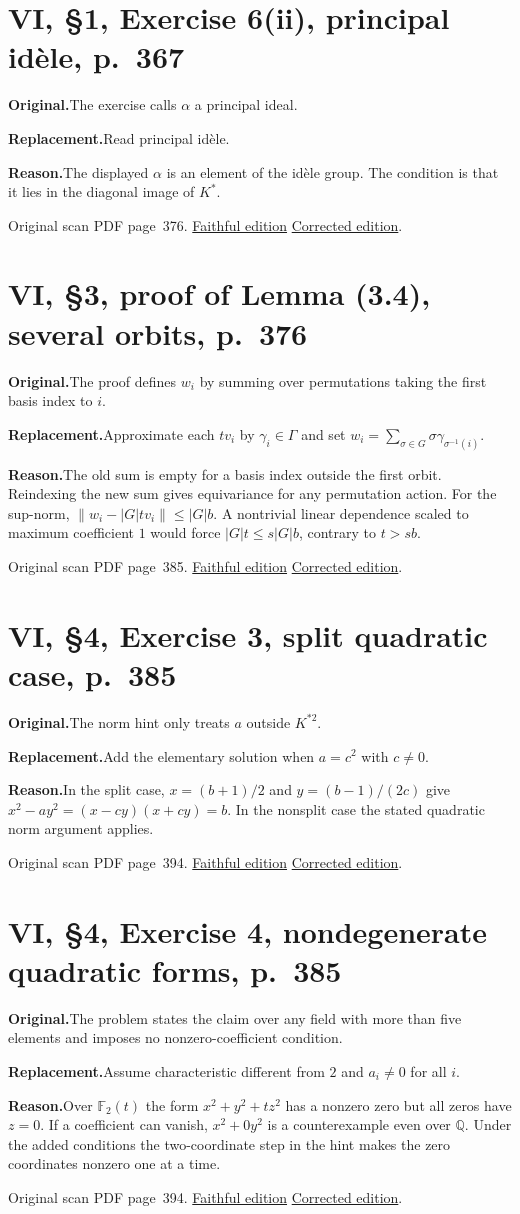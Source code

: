 \documentclass[11pt,a4paper]{article}
\newcommand{\original}{\par\smallskip\noindent\textbf{Original.}\enspace}
\newcommand{\replacement}{\par\smallskip\noindent\textbf{Replacement.}\enspace}
\newcommand{\reason}{\par\smallskip\noindent\textbf{Reason.}\enspace}
\newcommand{\editionlink}[3]{\href{#1\#errata.#2}{#3}}
\newcommand{\location}[2]{%
  \par\smallskip\noindent Original scan PDF page~#2.\enspace
  \editionlink{Neukirch_Faithful.pdf}{#1}{Faithful edition}
  \quad\editionlink{Neukirch_Corrected.pdf}{#1}{Corrected edition}.}
\begin{document}
\setcounter{section}{132}
\section{VI, \S1, Exercise 6(ii), principal idèle, p.~367}\label{errata:item:133}

\original The exercise calls $\alpha$ a principal ideal.
\replacement Read principal idèle.
\reason The displayed $\alpha$ is an element of the idèle group. The condition is that it lies in the diagonal image of $K^*$.
\location{133}{376}

\setcounter{section}{133}
\section{VI, \S3, proof of Lemma (3.4), several orbits, p.~376}\label{errata:item:134}

\original The proof defines $w_i$ by summing over permutations taking the first basis index to $i$.
\replacement Approximate each $tv_i$ by $\gamma_i\in\Gamma$ and set $w_i=\sum_{\sigma\in G}\sigma\gamma_{\sigma^{-1}(i)}$.
\reason The old sum is empty for a basis index outside the first orbit. Reindexing the new sum gives equivariance for any permutation action. For the sup-norm, $\|w_i-|G|tv_i\|\le |G|b$. A nontrivial linear dependence scaled to maximum coefficient $1$ would force $|G|t\le s|G|b$, contrary to $t>sb$.
\location{134}{385}

\setcounter{section}{134}
\section{VI, \S4, Exercise 3, split quadratic case, p.~385}\label{errata:item:135}

\original The norm hint only treats $a$ outside $K^{*2}$.
\replacement Add the elementary solution when $a=c^2$ with $c\ne0$.
\reason In the split case, $x=(b+1)/2$ and $y=(b-1)/(2c)$ give $x^2-ay^2=(x-cy)(x+cy)=b$. In the nonsplit case the stated quadratic norm argument applies.
\location{135}{394}

\setcounter{section}{135}
\section{VI, \S4, Exercise 4, nondegenerate quadratic forms, p.~385}\label{errata:item:136}

\original The problem states the claim over any field with more than five elements and imposes no nonzero-coefficient condition.
\replacement Assume characteristic different from $2$ and $a_i\ne0$ for all $i$.
\reason Over $\mathbb F_2(t)$ the form $x^2+y^2+tz^2$ has a nonzero zero but all zeros have $z=0$. If a coefficient can vanish, $x^2+0y^2$ is a counterexample even over $\mathbb Q$. Under the added conditions the two-coordinate step in the hint makes the zero coordinates nonzero one at a time.
\location{136}{394}
\end{document}
